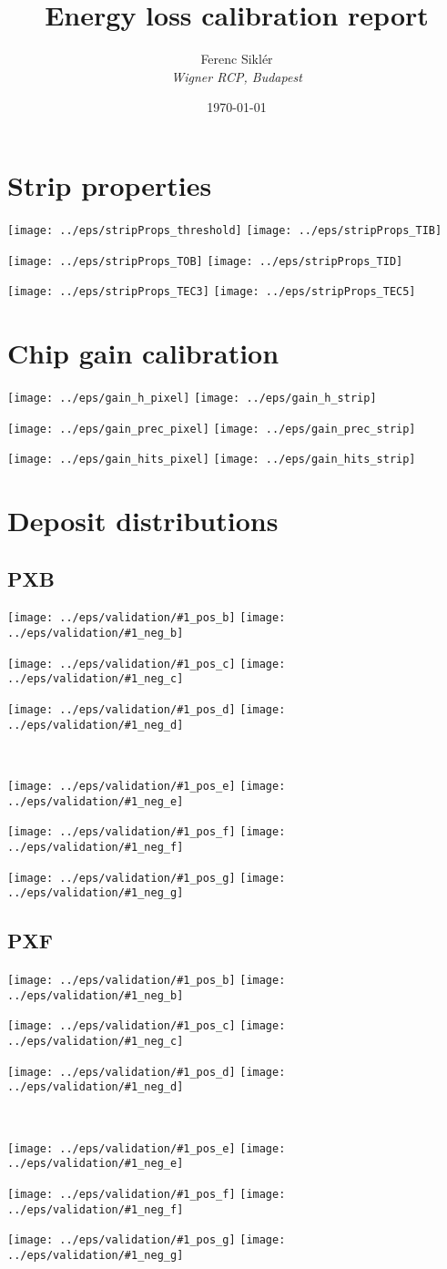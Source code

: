 \documentclass[a4paper]{article}
\newcommand{\valFigs}[1]{

\subsection{#1}

 \begin{center}
  \texttt{[image: ../eps/validation/\#1\_pos\_b]}
  \texttt{[image: ../eps/validation/\#1\_neg\_b]}

  \vspace{-0.2in}
  \texttt{[image: ../eps/validation/\#1\_pos\_c]}
  \texttt{[image: ../eps/validation/\#1\_neg\_c]}

  \vspace{-0.2in}
  \texttt{[image: ../eps/validation/\#1\_pos\_d]}
  \texttt{[image: ../eps/validation/\#1\_neg\_d]}
 \end{center}

 \newpage

 ~

\vspace{0.3in}

 \begin{center}
  \texttt{[image: ../eps/validation/\#1\_pos\_e]}
  \texttt{[image: ../eps/validation/\#1\_neg\_e]}

  \vspace{-0.2in}
  \texttt{[image: ../eps/validation/\#1\_pos\_f]}
  \texttt{[image: ../eps/validation/\#1\_neg\_f]}

  \vspace{-0.2in}
  \texttt{[image: ../eps/validation/\#1\_pos\_g]}
  \texttt{[image: ../eps/validation/\#1\_neg\_g]}
 \end{center}

 \newpage
}
\begin{document}
\title{Energy loss calibration report}
\date{\today}
\author{Ferenc Sikl\'er \\ \it Wigner RCP, Budapest}
\maketitle

\tableofcontents

\newpage

\section{Strip properties}

 \begin{center}
  \texttt{[image: ../eps/stripProps\_threshold]}
  \texttt{[image: ../eps/stripProps\_TIB]}

  \texttt{[image: ../eps/stripProps\_TOB]}
  \texttt{[image: ../eps/stripProps\_TID]}

  \texttt{[image: ../eps/stripProps\_TEC3]}
  \texttt{[image: ../eps/stripProps\_TEC5]}
 \end{center}

\section{Chip gain calibration}

 \begin{center}
  \texttt{[image: ../eps/gain\_h\_pixel]}
  \texttt{[image: ../eps/gain\_h\_strip]}

  \texttt{[image: ../eps/gain\_prec\_pixel]}
  \texttt{[image: ../eps/gain\_prec\_strip]}

  \texttt{[image: ../eps/gain\_hits\_pixel]}
  \texttt{[image: ../eps/gain\_hits\_strip]}
 \end{center}

\section{Deposit distributions}

 \valFigs{PXB}

 \valFigs{PXF}
\end{document}
